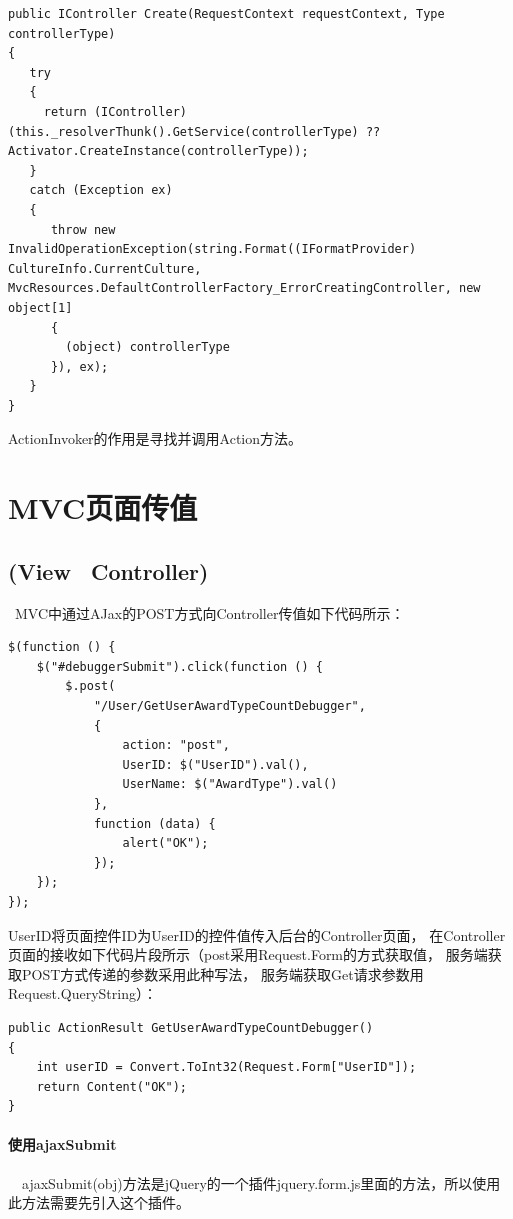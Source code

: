 \documentclass{book}
\begin{document}
\begin{lstlisting}[language={[Sharp]C},caption=MVC获取类的实例,label={code:GetControllerInstanceUsingReflection}]
public IController Create(RequestContext requestContext, Type controllerType)
{
   try
   {
     return (IController) (this._resolverThunk().GetService(controllerType) ?? Activator.CreateInstance(controllerType));
   }
   catch (Exception ex)
   {
      throw new InvalidOperationException(string.Format((IFormatProvider) CultureInfo.CurrentCulture, MvcResources.DefaultControllerFactory_ErrorCreatingController, new object[1]
      {
        (object) controllerType
      }), ex);
   }
}
\end{lstlisting}

ActionInvoker的作用是寻找并调用Action方法。


\section{MVC页面传值}

\subsection{(View \textrightarrow ~Controller)}
~MVC中通过AJax的POST方式向Controller传值如下代码所示：

\begin{lstlisting}[language=VBScript]
$(function () {
    $("#debuggerSubmit").click(function () {        
        $.post(
            "/User/GetUserAwardTypeCountDebugger",
            {
                action: "post",
                UserID: $("UserID").val(),
                UserName: $("AwardType").val()
            },
            function (data) {
                alert("OK");
            });
    });
});
\end{lstlisting}

UserID将页面控件ID为UserID的控件值传入后台的Controller页面，
在Controller页面的接收如下代码片段所示（post采用Request.Form的方式获取值，
服务端获取POST方式传递的参数采用此种写法，
服务端获取Get请求参数用Request.QueryString）：

\begin{lstlisting}[language={[Sharp]C}]
public ActionResult GetUserAwardTypeCountDebugger()
{
    int userID = Convert.ToInt32(Request.Form["UserID"]);    
    return Content("OK");
}
\end{lstlisting}

\paragraph{使用ajaxSubmit}~~ajaxSubmit(obj)方法是jQuery的一个插件jquery.form.js里面的方法，所以使用此方法需要先引入这个插件。
\end{document}
